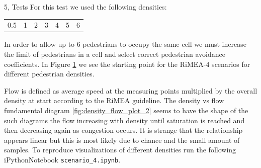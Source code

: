 \begin{task}{5, Tests}
For this test we used the following densities:
\begin{center}
\begin{tabular}{ c c c c c c c }
0.5 & 1 & 2 & 3 & 4 & 5 & 6
\end{tabular}
\end{center}

In order to allow up to 6 pedestrians to occupy the same cell we must increase the limit of pedestrians in a cell and select correct pedestrian avoidance coefficients. In Figure \ref{fig:density_flow_plot} we see the starting point for the RiMEA-4 scenarios for different pedestrian densities.

Flow is defined as average speed at the measuring points multiplied by the overall density at start according to the RiMEA guideline. The density vs flow fundamental diagram \ref{fig:density_flow_plot_2} seems to have the shape of the such diagrams the flow increasing with density until saturation is reached and then decreasing again as congestion occurs. It is strange that the relationship appears linear but this is most likely due to chance and the small amount of samples. To reproduce visualizations of different densities run the following iPythonNotebook \texttt{scenario\_4.ipynb}.

\begin{figure}[h!]
\centering
{}
\centering
{}
\centering
{}
\label{fig:density_flow_plot}
\end{figure}


\end{task}
